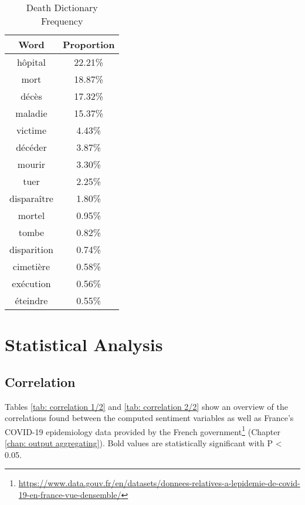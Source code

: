 \begin{table}[H]
\caption{Death Dictionary Frequency}
\label{tab:death freqs}
\centering
\begin{tabular}{@{}cc@{}}
\toprule
Word      & Proportion \\ \midrule
hôpital     & 22.21\% \\
mort        & 18.87\% \\
décès       & 17.32\% \\
maladie     & 15.37\% \\
victime     & 4.43\%  \\
décéder     & 3.87\%  \\
mourir      & 3.30\%  \\
tuer        & 2.25\%  \\
disparaître & 1.80\%  \\
mortel      & 0.95\%  \\
tombe       & 0.82\%  \\
disparition & 0.74\%  \\
cimetière   & 0.58\%  \\
exécution   & 0.56\%  \\
éteindre    & 0.55\%  \\ \bottomrule
\end{tabular}
\end{table}

\section{Statistical Analysis}

\subsection{Correlation}

Tables \ref{tab: correlation 1/2} and  \ref{tab: correlation 2/2} show an overview of the correlations found between the computed sentiment variables as well as France's COVID-19 epidemiology data provided by the French government\footnote{\url{https://www.data.gouv.fr/en/datasets/donnees-relatives-a-lepidemie-de-covid-19-en-france-vue-densemble/}} (Chapter \ref{chap: output aggregating}). Bold values are statistically significant with P < 0.05.

